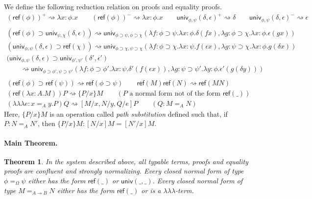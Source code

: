 \documentclass{easychair}
\newcommand{\univ}[4]{\mathsf{univ}_{{#1},{#2}} \left( {#3} , {#4} \right)}
\newcommand{\triplelambda}{\lambda \!\! \lambda \!\! \lambda}
\newcommand{\reff}[1]{\mathsf{ref} \left( {#1} \right)}
\newtheorem{theorem}[lemma]{Theorem}
\begin{document}
We define the following reduction relation on proofs and equality proofs.
\begin{gather*}
(\reff{\phi})^+ \rightsquigarrow \lambda x : \phi . x
\qquad
(\reff{\phi})^- \rightsquigarrow \lambda x : \phi . x
\qquad
\univ{\phi}{\psi}{\delta}{\epsilon}^+ \rightsquigarrow \delta
\qquad
\univ{\phi}{\psi}{\delta}{\epsilon}^- \rightsquigarrow \epsilon
\\ \\
(\reff \phi \supset \univ{\psi}{\chi}{\delta}{\epsilon}) \rightsquigarrow \univ{\phi \supset \psi}{\phi \supset \chi}{\lambda f : \phi \supset \psi . \lambda x : \phi . \delta (f x)}{\lambda g : \phi \supset \chi . \lambda x : \phi . \epsilon (g x)}
\\
(\univ{\phi}{\psi}{\delta}{\epsilon} \supset \reff{\chi}) \rightsquigarrow \univ{\phi \supset \chi}{\psi \supset \chi}{\lambda f : \phi \supset \chi. \lambda x : \psi . f (\epsilon x)}{\lambda g : \psi \supset \chi . \lambda x : \phi . g (\delta x)}
\\
(\univ{\phi}{\psi}{\delta}{\epsilon} \supset \univ{\phi'}{\psi'}{\delta'}{\epsilon'} \hspace{8cm} \\
\qquad \rightsquigarrow \univ{\phi \supset \phi'}{\psi \supset \psi'}
{\lambda f : \phi \supset \phi' . \lambda x : \psi . \delta' (f (\epsilon x))}{\lambda g : \psi \supset \psi' . \lambda y : \phi . \epsilon' (g (\delta y))}
\\ \\
(\reff{\phi} \supset \reff{\psi}) \rightsquigarrow \reff{\phi \supset \psi}
\qquad
\reff{M} \reff{N} \rightsquigarrow \reff{MN}
\\
(\reff{\lambda x:A.M})P \rightsquigarrow \{ P / x \} M \qquad (P \text{ a normal form not of the form } \reff{\_})
\\
(\triplelambda e : x =_A y.P)Q \rightsquigarrow [M/x, N/y, Q/e]P \qquad (Q : M =_A N)
\end{gather*}
Here, $\{ P / x \}M$ is an operation called \emph{path substitution} defined such that, if $P : N =_A N'$, then $\{ P / x \} M : [N/x]M = [N'/x]M$.

\paragraph{Main Theorem.}

\begin{theorem}
In the system described above, all typable terms, proofs and equality proofs are confluent and strongly normalizing.  Every closed normal form of type $\phi =_\Omega \psi$ either has the form $\reff{\_}$ or $\mathsf{univ}(\_,\_)$.  Every closed normal form of type $M =_{A \rightarrow B} N$ either has the form $\reff{\_}$ or is a $\triplelambda$-term.
\end{theorem}
\end{document}
